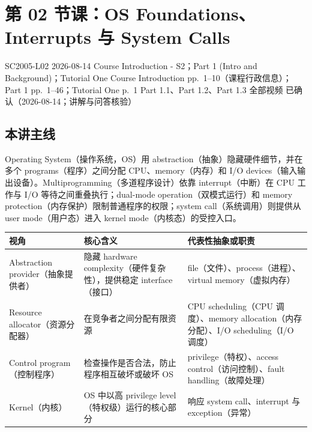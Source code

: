 
\section{第 02 节课：OS Foundations、Interrupts 与 System Calls}
\label{lecture:SC2005-L02}

\lecturemeta
  {SC2005-L02}
  {2026-08-14}
  {Course Introduction - S2；Part 1 (Intro and Background)；Tutorial One}
  {Course Introduction pp.~1--10（课程行政信息）；Part 1 pp.~1--46；Tutorial One p.~1}
  {Part 1.1、Part 1.2、Part 1.3 全部视频}
  {已确认（2026-08-14；讲解与问答核验）}

\subsection{本讲主线}

Operating System（操作系统，OS）用 abstraction（抽象）隐藏硬件细节，并在多个 programs（程序）之间分配 CPU、memory（内存）和 I/O devices（输入输出设备）。Multiprogramming（多道程序设计）依靠 interrupt（中断）在 CPU 工作与 I/O 等待之间重叠执行；dual-mode operation（双模式运行）和 memory protection（内存保护）限制普通程序的权限；system call（系统调用）则提供从 user mode（用户态）进入 kernel mode（内核态）的受控入口。



\begin{center}
\small
\begin{tabularx}{\textwidth}{@{}>{\raggedright\arraybackslash}p{3.1cm}>{\raggedright\arraybackslash}p{4.4cm}X@{}}
  \toprule
  视角 & 核心含义 & 代表性抽象或职责 \\
  \midrule
  Abstraction provider（抽象提供者） & 隐藏 hardware complexity（硬件复杂性），提供稳定 interface（接口） & file（文件）、process（进程）、virtual memory（虚拟内存） \\
  Resource allocator（资源分配器） & 在竞争者之间分配有限资源 & CPU scheduling（CPU 调度）、memory allocation（内存分配）、I/O scheduling（I/O 调度） \\
  Control program（控制程序） & 检查操作是否合法，防止程序相互破坏或破坏 OS & privilege（特权）、access control（访问控制）、fault handling（故障处理） \\
  Kernel（内核） & OS 中以高 privilege level（特权级）运行的核心部分 & 响应 system call、interrupt 与 exception（异常） \\
  \bottomrule
\end{tabularx}
\end{center}

